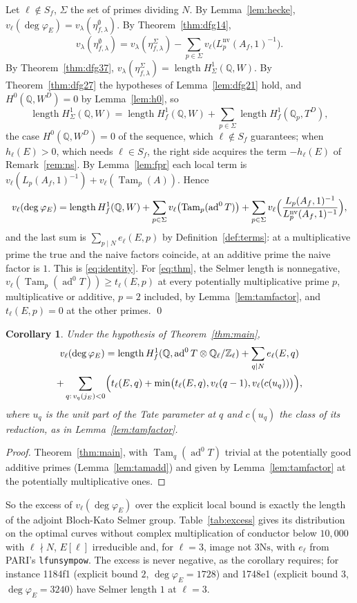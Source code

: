 \documentclass[11pt]{amsart}
\newtheorem{corollary}[theorem]{Corollary}
\theoremstyle{definition}
\newcommand{\Q}{\mathbb{Q}}
\newcommand{\Z}{\mathbb{Z}}
\newcommand{\degphi}{\deg\varphi_E}
\newcommand{\ad}{\operatorname{ad}^0}
\newcommand{\nv}{\mathrm{nv}}
\newcommand{\Tam}{\operatorname{Tam}}
\newcommand{\len}{\operatorname{length}}
\newcommand{\Ns}{3\mathrm{Ns}}
\begin{document}
Let $\ell\notin S_f$, $\Sigma$ the set of primes dividing $N$. By Lemma~\ref{lem:hecke}, $v_\ell(\degphi)=v_\lambda(\eta^\emptyset_{f,\lambda})$. By Theorem~\ref{thm:dfg14},
\[
v_\lambda(\eta^\emptyset_{f,\lambda})=v_\lambda(\eta^\Sigma_{f,\lambda})-\sum_{p\in\Sigma}v_\ell\bigl(L_p^{\nv}(A_f,1)^{-1}\bigr).
\]
By Theorem~\ref{thm:dfg37}, $v_\lambda(\eta^\Sigma_{f,\lambda})=\len H^1_\Sigma(\Q,W)$. By Theorem~\ref{thm:dfg27} the hypotheses of Lemma~\ref{lem:dfg21} hold, and $H^0(\Q,W^D)=0$ by Lemma~\ref{lem:h0}, so
\[
\len H^1_\Sigma(\Q,W)=\len H^1_f(\Q,W)+\sum_{p\in\Sigma}\len H^1_f(\Q_p,T^D),
\]
the case $H^0(\Q,W^D)=0$ of the sequence, which $\ell\notin S_f$ guarantees; when $h_\ell(E)>0$, which needs $\ell\in S_f$, the right side acquires the term $-h_\ell(E)$ of Remark~\ref{rem:ns}. By Lemma~\ref{lem:fpr} each local term is $v_\ell(L_p(A_f,1)^{-1})+v_\ell(\Tam_p(A))$. Hence
\[
v_\ell(\degphi)=\len H^1_f(\Q,W)+\sum_{p\in\Sigma}v_\ell\bigl(\Tam_p(\ad T)\bigr)+\sum_{p\in\Sigma}v_\ell\Bigl(\frac{L_p(A_f,1)^{-1}}{L^{\nv}_p(A_f,1)^{-1}}\Bigr),
\]
and the last sum is $\sum_{p\mid N}e_\ell(E,p)$ by Definition~\ref{def:terms}: at a multiplicative prime the true and the naive factors coincide, at an additive prime the naive factor is $1$. This is \eqref{eq:identity}. For \eqref{eq:thm}, the Selmer length is nonnegative, $v_\ell(\Tam_p(\ad T))\ge t_\ell(E,p)$ at every potentially multiplicative prime $p$, multiplicative or additive, $p=2$ included, by Lemma~\ref{lem:tamfactor}, and $t_\ell(E,p)=0$ at the other primes. \qed

\begin{corollary}\label{cor:explicit}
Under the hypothesis of Theorem~\ref{thm:main},
\begin{multline*}
v_\ell(\degphi)=\len H^1_f(\Q,\ad T\otimes\Q_\ell/\Z_\ell)+\sum_{q\mid N}e_\ell(E,q)\\
+\sum_{q:\,v_q(j_E)<0}\Bigl(t_\ell(E,q)+\min\bigl(t_\ell(E,q),v_\ell(q-1),v_\ell(c(u_q))\bigr)\Bigr),
\end{multline*}
where $u_q$ is the unit part of the Tate parameter at $q$ and $c(u_q)$ the class of its reduction, as in Lemma~\ref{lem:tamfactor}.
\end{corollary}
\begin{proof}
Theorem~\ref{thm:main}, with $\Tam_q(\ad T)$ trivial at the potentially good additive primes (Lemma~\ref{lem:tamadd}) and given by Lemma~\ref{lem:tamfactor} at the potentially multiplicative ones.
\end{proof}

So the excess of $v_\ell(\degphi)$ over the explicit local bound is exactly the length of the adjoint Bloch-Kato Selmer group. Table~\ref{tab:excess} gives its distribution on the optimal curves without complex multiplication of conductor below $10{,}000$ with $\ell\nmid N$, $E[\ell]$ irreducible and, for $\ell=3$, image not $\Ns$, with $e_\ell$ from PARI's \texttt{lfunsympow}. The excess is never negative, as the corollary requires; for instance 1184f1 (explicit bound $2$, $\degphi=1728$) and 1748e1 (explicit bound $3$, $\degphi=3240$) have Selmer length $1$ at $\ell=3$.
\end{document}
